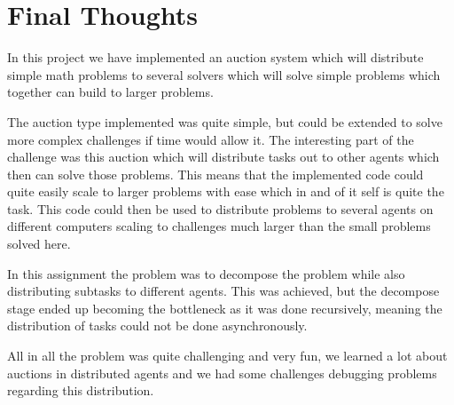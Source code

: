 \section{Final Thoughts}\label{sec:final-thoughts}
In this project we have implemented an auction system which will distribute
simple math problems to several solvers which will solve simple problems which
together can build to larger problems.

The auction type implemented was quite simple, but could be extended to solve
more complex challenges if time would allow it. The interesting part of the
challenge was this auction which will distribute tasks out to other agents which
then can solve those problems. This means that the implemented code could quite
easily scale to larger problems with ease which in and of it self is quite the
task. This code could then be used to distribute problems to several agents on
different computers scaling to challenges much larger than the small problems
solved here.

In this assignment the problem was to decompose the problem while
also distributing subtasks to different agents. This was achieved, but the
decompose stage ended up becoming the bottleneck as it was done recursively,
meaning the distribution of tasks could not be done asynchronously.

All in all the problem was quite challenging and very fun, we learned a lot
about auctions in distributed agents and we had some challenges debugging
problems regarding this distribution.
